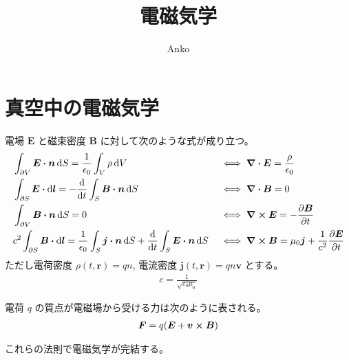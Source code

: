 \documentclass[uplatex,dvipdfmx,a4paper,11pt]{jlreq}
\title{電磁気学}
\author{Anko}
\newcommand{\EE}{\bm{E}}
\newcommand{\BB}{\bm{B}}
\newcommand{\rr}{\bm{r}}
\theoremstyle{definition}
\begin{document}
\maketitle

\section{真空中の電磁気学}
\begin{definition}
  電場 $\EE$ と磁束密度 $\BB$ に対して次のような式が成り立つ。
  \begin{align}
     & \int_{\partial V}\EE\vdot\bm{n}\dd{S} = \frac{1}{\epsilon_0}\int_V\rho\dd{V}                                                   &  & \iff \vnabla\vdot\EE  = \frac{\rho}{\epsilon_0}                                \\
     & \int_{\partial S}\EE\vdot\dd{\bm{l}} = -\dv{t}\int_S\BB\vdot\bm{n}\dd{S}                                                       &  & \iff \vnabla\vdot\BB  = 0                                                      \\
     & \int_{\partial V}\BB\vdot\bm{n}\dd{S} = 0                                                                                      &  & \iff \vnabla\cross\EE = -\pdv{\BB}{t}                                          \\
     & c^2\int_{\partial S}\BB\vdot\dd{\bm{l}} = \frac{1}{\epsilon_0}\int_S\bm{j}\vdot\bm{n}\dd{S} + \dv{t}\int_S\EE\vdot\bm{n}\dd{S} &  & \iff \vnabla\cross\BB = \mu_0\bm{j} + \frac{1}{c^2}\pdv{\EE}{t} \label{Ampere}
  \end{align}
  ただし電荷密度 $\rho(t, \rr) = qn$, 電流密度 $\bm{j}(t, \rr) = qn\bm{v}$ とする。
  \begin{align}
    c = \frac{1}{\sqrt{\varepsilon_0\mu_0}}
  \end{align}
\end{definition}
\begin{definition}[Lorentz 力]
  電荷 $q$ の質点が電磁場から受ける力は次のように表される。
  \begin{align}
    \bm{F} = q(\EE + \bm{v}\cross\BB)
  \end{align}
\end{definition}
これらの法則で電磁気学が完結する。
\end{document}
